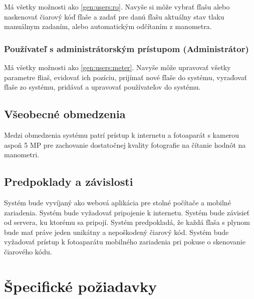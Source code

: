 \documentclass[hreffootnote]{zah}
\begin{document}
Má všetky možnosti ako \ref{gen:users:ro}. Navyše si môže vybrať fľašu alebo naskenovať čiarový kóď fľaše a zadať pre danú fľašu aktuálny stav tlaku manuálnym zadaním, alebo automatickým odčítaním z manometra.

\subsubsection{Používateľ s administrátorským prístupom (Administrátor)}
\label{gen:users:admin}

Má všetky možnosti ako \ref{gen:users:meter}. Navyše môže upravovať všetky parametre fliaš, evidovať ich pozíciu, prijímať nové fľaše do systému, vyraďovať fľaše zo systému, pridávať a upravovať používateľov do systému.

\subsection{Všeobecné obmedzenia}
\label{gen:constraints}

Medzi obmedzenia systému patrí prístup k internetu a fotoaparát s kamerou aspoň 5 MP pre zachovanie dostatočnej kvality fotografie na čítanie hodnôt na manometri. 

\subsection{Predpoklady a závislosti}
\label{gen:deps}

Systém bude vyvíjaný ako webová aplikácia pre stolné počítače a mobilné zariadenia. Systém bude vyžadovať pripojenie k internetu. Systém bude závisieť od servera, ku ktorému sa pripojí. Systém predpokladá, že každá fľaša s plynom bude mať práve jeden unikátny a nepoškodený čiarový kód. Systém bude vyžadovať prístup k fotoaparátu mobilného zariadenia pri pokuse o skenovanie čiarového kódu.

\cleardoublepage
\section{Špecifické požiadavky}
\label{reqs}
\end{document}
